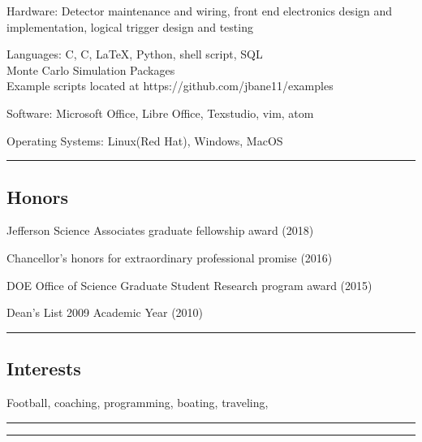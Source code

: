 \documentclass[10pt,letterpaper]{article}
\newenvironment{indentsection}[1]%
{\begin{list}{}%
	{\setlength{\leftmargin}{#1}}%
	\item[]%
}
{\end{list}}
\newcommand{\CPP}
{C\nolinebreak[4]\hspace{-.05em}\raisebox{.22ex}{\footnotesize\bf ++}}
\begin{document}
\begin{indentsection}{\parindent}
\begin{description*}
	\item[Hardware:]
	Detector maintenance and wiring, front end electronics design and implementation, logical trigger design and testing   
	\item[Languages:]
	C, \CPP, \LaTeX, Python, shell script, SQL \\
	Monte Carlo Simulation Packages\\
	Example scripts located at https://github.com/jbane11/examples
	\item[Software:]
	Microsoft Office, Libre Office, Texstudio, vim, atom
	\item[Operating Systems:]
	Linux(Red Hat), Windows, MacOS
	
\end{description*}
\end{indentsection}
\hrule
\vspace{-0.6em}
\subsection*{Honors}
	\begin{itemize*}
		\item Jefferson Science Associates graduate fellowship award (2018)  
		\item Chancellor’s honors for extraordinary professional promise (2016) 
		\item DOE Office of Science Graduate Student Research program award (2015)
		\item Dean's List 2009 Academic Year (2010)
	\end{itemize*}
\hrule


\subsection*{Interests}

	Football, coaching, programming, boating, traveling,
\hrule
\hrule
\end{document}
